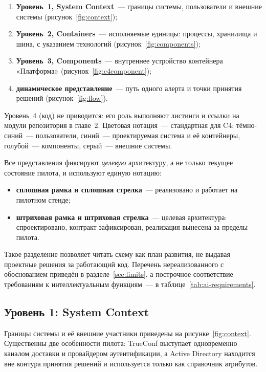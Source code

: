 \documentclass[utf8x, 12pt]{G7-32} %
\begin{document}
\begin{enumerate}[1.]
    \item \textbf{Уровень~1, System Context}~--- границы системы, пользователи
          и внешние системы (рисунок~\ref{fig:context});
    \item \textbf{Уровень~2, Containers}~--- исполняемые единицы: процессы,
          хранилища и шина, с указанием технологий
          (рисунок~\ref{fig:components});
    \item \textbf{Уровень~3, Components}~--- внутреннее устройство контейнера
          «Платформа» (рисунок~\ref{fig:c4component});
    \item \textbf{динамическое представление}~--- путь одного алерта и точки
          принятия решений (рисунок~\ref{fig:flow}).
\end{enumerate}

Уровень~4 (код) не приводится: его роль выполняют листинги и ссылки на модули
репозитория в главе~2. Цветовая нотация~--- стандартная для C4: тёмно-синий~---
пользователи, синий~--- проектируемая система и её контейнеры, голубой~---
компоненты, серый~--- внешние системы.

Все представления фиксируют \emph{целевую} архитектуру, а не только текущее
состояние пилота, и используют единую нотацию:
\begin{itemize}
    \item \textbf{сплошная рамка и сплошная стрелка}~--- реализовано и
          работает на пилотном стенде;
    \item \textbf{штриховая рамка и штриховая стрелка}~--- целевая
          архитектура: спроектировано, контракт зафиксирован, реализация
          вынесена за пределы пилота.
\end{itemize}
Такое разделение позволяет читать схему как план развития, не выдавая
проектные решения за работающий код. Перечень нереализованного с обоснованием
приведён в разделе~\ref{sec:limits}, а построчное соответствие требованиям к
интеллектуальным функциям~--- в таблице~\ref{tab:ai-requirements}.

\subsection{Уровень 1: System Context}
Границы системы и её внешние участники приведены на
рисунке~\ref{fig:context}. Существенны две особенности пилота: TrueConf
выступает одновременно каналом доставки и провайдером аутентификации, а
Active Directory находится вне контура принятия решений и используется только
как справочник атрибутов.
\end{document}
